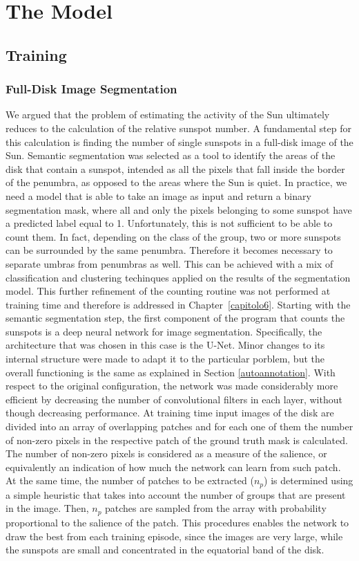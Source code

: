 \chapter{The Model}
\label{capitolo7}
\section{Training}
\subsection{Full-Disk Image Segmentation}
\noindent We argued that the problem of estimating the activity of the Sun ultimately reduces to the calculation of the relative sunspot number. A fundamental step for this calculation is finding the number of single sunspots in a full-disk image of the Sun. Semantic segmentation was selected as a tool to identify the areas of the disk that contain a sunspot, intended as all the pixels that fall inside the border of the penumbra, as opposed to the areas where the Sun is quiet.
\bigbreak
\noindent In practice, we need a model that is able to take an image as input and return a binary segmentation mask, where all and only the pixels belonging to some sunspot have a predicted label equal to 1. Unfortunately, this is not sufficient to be able to count them. In fact, depending on the class of the group, two or more sunspots can be surrounded by the same penumbra. Therefore it becomes necessary to separate umbras from penumbras as well. This can be achieved with a mix of classification and clustering techinques applied on the results of the segmentation model. This further refinement of the counting routine was not performed at training time and therefore is addressed in Chapter~\ref{capitolo6}.
\bigbreak
\noindent Starting with the semantic segmentation step, the first component of the program that counts the sunspots is a deep neural network for image segmentation. Specifically, the architecture that was chosen in this case is the U-Net. Minor changes to its internal structure were made to adapt it to the particular porblem, but the overall functioning  is the same as explained in Section \ref{autoannotation}. With respect to the original configuration, the network was made considerably more efficient by decreasing the number of convolutional filters in each layer, without though decreasing performance.
\bigbreak
\noindent At training time input images of the disk are divided into an array of overlapping patches and for each one of them the number of non-zero pixels in the respective patch of the ground truth mask is calculated. The number of non-zero pixels is considered as a measure of the salience, or equivalently an indication of how much the network can learn from such patch. At the same time, the number of patches to be extracted ($n_p$) is determined using a simple heuristic that takes into account the number of groups that are present in the image. Then, $n_p$ patches are sampled from the array with probability proportional to the salience of the patch. This procedures enables the network to draw the best from each training episode, since the images are very large, while the sunspots are small and concentrated in the equatorial band of the disk.
